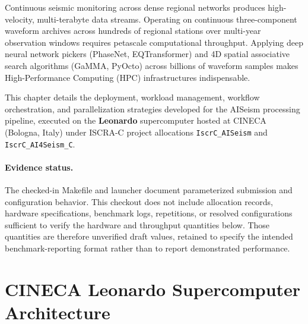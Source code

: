 
\label{units:chap:hpc}

Continuous seismic monitoring across dense regional networks produces high-velocity, multi-terabyte data streams. Operating on continuous three-component waveform archives across hundreds of regional stations over multi-year observation windows requires petascale computational throughput. Applying deep neural network pickers (\ac{PhaseNet}, \ac{EQTransformer}) and 4D spatial associative search algorithms (\ac{GaMMA}, \ac{PyOcto}) across billions of waveform samples makes High-Performance Computing (HPC) infrastructures indispensable.

This chapter details the deployment, workload management, workflow orchestration, and parallelization strategies developed for the AISeism processing pipeline, executed on the \textbf{Leonardo} supercomputer hosted at \ac{CINECA} (Bologna, Italy) under ISCRA-C project allocations \texttt{IscrC\_AISeism} and \texttt{IscrC\_AI4Seism\_C}.

\paragraph{Evidence status.} The checked-in Makefile and launcher document parameterized submission and configuration behavior. This checkout does not include allocation records, hardware specifications, benchmark logs, repetitions, or resolved configurations sufficient to verify the hardware and throughput quantities below. Those quantities are therefore unverified draft values, retained to specify the intended benchmark-reporting format rather than to report demonstrated performance.

\section{CINECA Leonardo Supercomputer Architecture}
\label{sec:leonardo_architecture}

